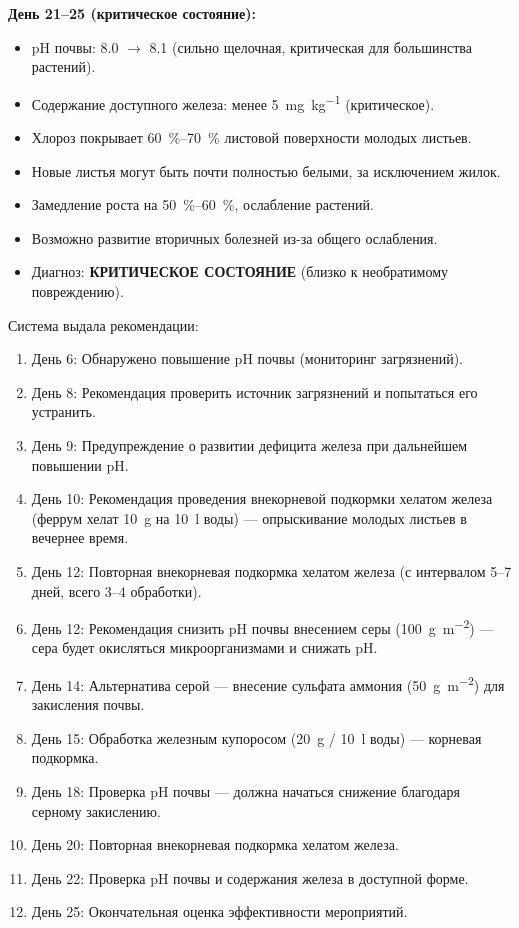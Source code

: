 \textbf{День 21--25 (критическое состояние):}
\begin{itemize}
    \item pH почвы: \num{8.0} $\to$ \num{8.1} (сильно щелочная, критическая для большинства растений).
    \item Содержание доступного железа: менее \SI{5}{\milli\gram\per\kilogram} (критическое).
    \item Хлороз покрывает \SIrange{60}{70}{\percent} листовой поверхности молодых листьев.
    \item Новые листья могут быть почти полностью белыми, за исключением жилок.
    \item Замедление роста на \SIrange{50}{60}{\percent}, ослабление растений.
    \item Возможно развитие вторичных болезней из-за общего ослабления.
    \item Диагноз: \textbf{КРИТИЧЕСКОЕ СОСТОЯНИЕ} (близко к необратимому повреждению).
\end{itemize}

Система выдала рекомендации:
\begin{enumerate}
    \item День 6: Обнаружено повышение pH почвы (мониторинг загрязнений).
    \item День 8: Рекомендация проверить источник загрязнений и попытаться его устранить.
    \item День 9: Предупреждение о развитии дефицита железа при дальнейшем повышении pH.
    \item День 10: Рекомендация проведения внекорневой подкормки хелатом железа (феррум хелат \SI{10}{\gram} на \SI{10}{\litre} воды) --- опрыскивание молодых листьев в вечернее время.
    \item День 12: Повторная внекорневая подкормка хелатом железа (с интервалом \num{5}--\num{7} дней, всего \num{3}--\num{4} обработки).
    \item День 12: Рекомендация снизить pH почвы внесением серы (\SI{100}{\gram\per\square\meter}) --- сера будет окисляться микроорганизмами и снижать pH.
    \item День 14: Альтернатива серой --- внесение сульфата аммония (\SI{50}{\gram\per\square\meter}) для закисления почвы.
    \item День 15: Обработка железным купоросом (\SI{20}{\gram} / \SI{10}{\litre} воды) --- корневая подкормка.
    \item День 18: Проверка pH почвы --- должна начаться снижение благодаря серному закислению.
    \item День 20: Повторная внекорневая подкормка хелатом железа.
    \item День 22: Проверка pH почвы и содержания железа в доступной форме.
    \item День 25: Окончательная оценка эффективности мероприятий.
\end{enumerate}

